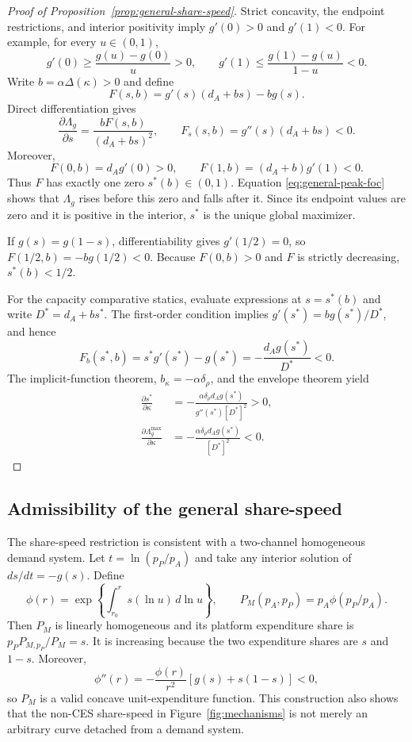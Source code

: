 \begin{proof}[Proof of Proposition~\ref{prop:general-share-speed}]
Strict concavity, the endpoint restrictions, and interior positivity imply
\(g'(0)>0\) and \(g'(1)<0\). For example, for every \(u\in(0,1)\),
\[
 g'(0)\geq\frac{g(u)-g(0)}u>0,
 \qquad
 g'(1)\leq\frac{g(1)-g(u)}{1-u}<0.
\]
Write \(b=\alpha\Delta(\kappa)>0\) and define
\[
 F(s,b)=g'(s)(d_A+bs)-bg(s).
\]
Direct differentiation gives
\begin{equation}
 \frac{\partial\Lambda_g}{\partial s}
 =\frac{bF(s,b)}{(d_A+bs)^2},
 \qquad
 F_s(s,b)=g''(s)(d_A+bs)<0.
 \label{eq:general-peak-foc}
\end{equation}
Moreover,
\[
 F(0,b)=d_Ag'(0)>0,
 \qquad
 F(1,b)=(d_A+b)g'(1)<0.
\]
Thus \(F\) has exactly one zero \(s^*(b)\in(0,1)\). Equation
\eqref{eq:general-peak-foc} shows that \(\Lambda_g\) rises before this zero and
falls after it. Since its endpoint values are zero and it is positive in the
interior, \(s^*\) is the unique global maximizer.

If \(g(s)=g(1-s)\), differentiability gives \(g'(1/2)=0\), so
\(F(1/2,b)=-bg(1/2)<0\). Because \(F(0,b)>0\) and \(F\) is strictly
decreasing, \(s^*(b)<1/2\).

For the capacity comparative statics, evaluate expressions at \(s=s^*(b)\)
and write \(D^*=d_A+bs^*\). The first-order condition implies
\(g'(s^*)=bg(s^*)/D^*\), and hence
\[
 F_b(s^*,b)=s^*g'(s^*)-g(s^*)
 =-\frac{d_Ag(s^*)}{D^*}<0.
\]
The implicit-function theorem, \(b_\kappa=-\alpha\delta_\rho\), and the
envelope theorem yield
\begin{align}
 \frac{\partial s^*}{\partial\kappa}
 &=-\frac{\alpha\delta_\rho d_Ag(s^*)}
 {g''(s^*)[D^*]^2}>0, \\
 \frac{\partial\Lambda_g^{\max}}{\partial\kappa}
 &=-\frac{\alpha\delta_\rho d_Ag(s^*)}{[D^*]^2}<0.
 \label{eq:general-peak-comparative-statics-proof}
\end{align}
\end{proof}

\subsection{Admissibility of the general share-speed}

The share-speed restriction is consistent with a two-channel homogeneous demand
system. Let \(t=\ln(p_P/p_A)\) and take any interior solution of
\(ds/dt=-g(s)\). Define
\[
 \phi(r)=\exp\left\{\int_{r_0}^{r}s(\ln u)\,d\ln u\right\},
 \qquad
 P_M(p_A,p_P)=p_A\phi(p_P/p_A).
\]
Then \(P_M\) is linearly homogeneous and its platform expenditure share is
\(p_P P_{M,p_P}/P_M=s\). It is increasing because the two expenditure shares
are \(s\) and \(1-s\). Moreover,
\[
 \phi''(r)
 =-\frac{\phi(r)}{r^2}\left[g(s)+s(1-s)\right]<0,
\]
so \(P_M\) is a valid concave unit-expenditure function. This construction also
shows that the non-CES share-speed in Figure~\ref{fig:mechanisms} is not merely
an arbitrary curve detached from a demand system.

